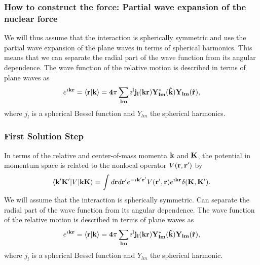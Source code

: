 \documentclass[compress]{beamer}
\newcommand*{\ket}[1]{|#1\rangle}
\newcommand*{\bra}[1]{\langle#1|}
\begin{document}
\frame
{
\frametitle{How to construct the force: Partial wave expansion of the nuclear force}

\begin{small}
{\scriptsize
We will thus assume that the interaction is spherically symmetric and use
the partial wave expansion of the plane waves in
terms of spherical harmonics.
This means that we can separate the radial part of the wave function from its
angular dependence. The wave function of the relative motion is described
in terms of plane waves as
\begin{equation}
       e^{\imath {\bf kr}}  =
       \bra{\bf r}{\bf k}\rangle =  4\pi \sum_{lm} \imath ^{l}
        j_{l} (kr) Y_{lm}^{*}({\bf \hat{k}}) Y_{lm}({\bf \hat{r}}),
\end{equation}
where $j_l$ is a spherical Bessel function and $Y_{lm}$ the
spherical harmonics.
}
\end{small}
}


\frame
{
\frametitle{First Solution Step}
\begin{small}
{\scriptsize
In terms of the relative and center-of-mass momenta ${\bf k}$ and
${\bf K}$, the potential in momentum space is related to the nonlocal operator
$V({\bf r},{\bf r}')$ by
\[
      \bra{{\bf k'K'}}V \ket{{\bf kK}} =
       \int d {\bf r}d {\bf r'}
        e^{-\imath {\bf k'r'}}V({\bf r'},{\bf r}) e^{\imath {\bf kr}}
       \delta({\bf K},{\bf K'}).
\]
We will assume that the interaction is spherically symmetric.
Can separate the radial part of the wave function from its
angular dependence. The wave function of the relative motion is described
in terms of plane waves as
\[
       e^{\imath {\bf kr}}  =
       \bra{\bf r}{\bf k}\rangle =  4\pi \sum_{lm} \imath ^{l}
        j_{l} (kr) Y_{lm}^{*}({\bf \hat{k}}) Y_{lm}({\bf \hat{r}}),
\]
where $j_l$ is a spherical Bessel function and $Y_{lm}$ the
spherical harmonic.
}
\end{small}

}
\end{document}
